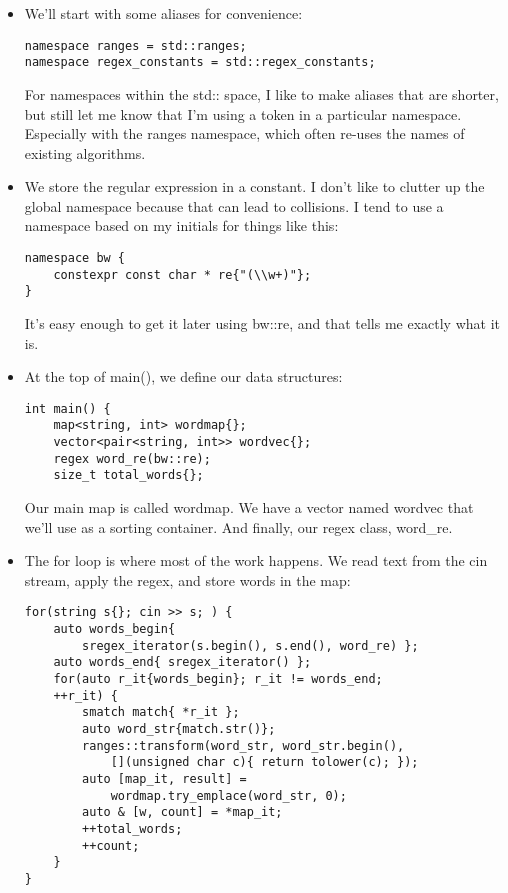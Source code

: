 \begin{itemize}
\item 
We'll start with some aliases for convenience:

\begin{lstlisting}[style=styleCXX]
namespace ranges = std::ranges;
namespace regex_constants = std::regex_constants;
\end{lstlisting}

For namespaces within the std:: space, I like to make aliases that are shorter, but still let me know that I'm using a token in a particular namespace. Especially with the ranges namespace, which often re-uses the names of existing algorithms.

\item 
We store the regular expression in a constant. I don't like to clutter up the global namespace because that can lead to collisions. I tend to use a namespace based on my initials for things like this:

\begin{lstlisting}[style=styleCXX]
namespace bw {
	constexpr const char * re{"(\\w+)"};
}
\end{lstlisting}

It's easy enough to get it later using bw::re, and that tells me exactly what it is.

\item 
At the top of main(), we define our data structures:

\begin{lstlisting}[style=styleCXX]
int main() {
	map<string, int> wordmap{};
	vector<pair<string, int>> wordvec{};
	regex word_re(bw::re);
	size_t total_words{};
\end{lstlisting}

Our main map is called wordmap. We have a vector named wordvec that we'll use as a sorting container. And finally, our regex class, word\_re.

\item 
The for loop is where most of the work happens. We read text from the cin stream, apply the regex, and store words in the map:

\begin{lstlisting}[style=styleCXX]
for(string s{}; cin >> s; ) {
	auto words_begin{
		sregex_iterator(s.begin(), s.end(), word_re) };
	auto words_end{ sregex_iterator() };
	for(auto r_it{words_begin}; r_it != words_end;
	++r_it) {
		smatch match{ *r_it };
		auto word_str{match.str()};
		ranges::transform(word_str, word_str.begin(),
			[](unsigned char c){ return tolower(c); });
		auto [map_it, result] =
			wordmap.try_emplace(word_str, 0);
		auto & [w, count] = *map_it;
		++total_words;
		++count;
	}
}
\end{lstlisting}


\end{itemize}
